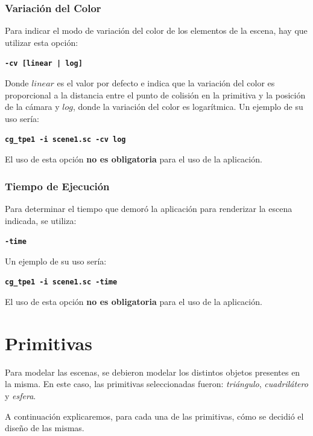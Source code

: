 \documentclass[a4paper,10pt]{article}
\begin{document}
\subsubsection{Variaci\'on del Color}

Para indicar el modo de variaci\'on del color de los elementos de la escena, hay que utilizar esta opci\'on:

\begin{center}
  \textbf{\texttt{-cv [linear | log]}}
\end{center}

Donde $linear$ es el valor por defecto e indica que la variaci\'on del color es proporcional a la distancia entre el punto de colisi\'on en la primitiva y la posici\'on de la c\'amara y $log$, donde la variaci\'on del color es logar\'itmica.  Un ejemplo de su uso ser\'ia:

 \begin{center}
 \textbf{\texttt{cg\_tpe1 -i scene1.sc -cv log}}
\end{center}

El uso de esta opci\'on \textbf{no es obligatoria} para el uso de la aplicaci\'on.

\subsubsection{Tiempo de Ejecuci\'on}

Para determinar el tiempo que demor\'o la aplicaci\'on para renderizar la escena indicada, se utiliza:

\begin{center}
  \textbf{\texttt{-time}}
\end{center}

Un ejemplo de su uso ser\'ia:

 \begin{center}
 \textbf{\texttt{cg\_tpe1 -i scene1.sc -time}}
\end{center}
El uso de esta opci\'on \textbf{no es obligatoria} para el uso de la aplicaci\'on.

\section{Primitivas}

Para modelar las escenas, se debieron modelar los distintos objetos presentes en la misma.  En este caso, las primitivas seleccionadas fueron: \emph{tri\'angulo}, \emph{cuadril\'atero} y \emph{esfera}.

A continuaci\'on explicaremos, para cada una de las primitivas, c\'omo se decidi\'o el dise\~no de las mismas.
\end{document}

